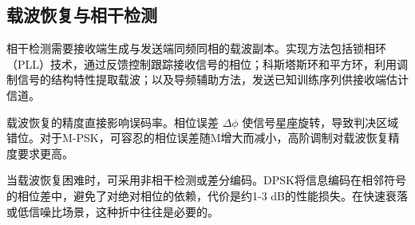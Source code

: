 \subsection{载波恢复与相干检测}

相干检测需要接收端生成与发送端同频同相的载波副本。实现方法包括锁相环（PLL）技术，通过反馈控制跟踪接收信号的相位；科斯塔斯环和平方环，利用调制信号的结构特性提取载波；以及导频辅助方法，发送已知训练序列供接收端估计信道。

载波恢复的精度直接影响误码率。相位误差 $\Delta\phi$ 使信号星座旋转，导致判决区域错位。对于M-PSK，可容忍的相位误差随M增大而减小，高阶调制对载波恢复精度要求更高。

当载波恢复困难时，可采用非相干检测或差分编码。DPSK将信息编码在相邻符号的相位差中，避免了对绝对相位的依赖，代价是约1-3 dB的性能损失。在快速衰落或低信噪比场景，这种折中往往是必要的。
